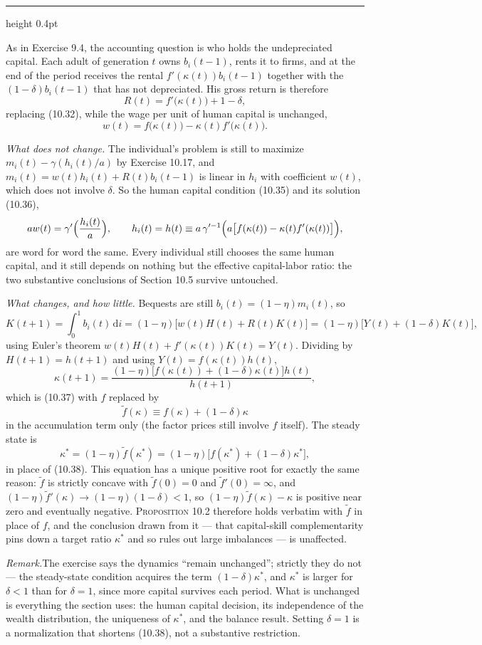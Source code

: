 \documentclass[11pt,letterpaper,reqno]{amsart}
\makeatletter
\newcommand{\wt}[1]{\widetilde{#1}}
\newcommand{\dd}{\,\mathrm{d}}
\newcommand{\as@head}[3]{%
  \par\addvspace{1.6ex}\penalty-200\relax
  \phantomsection
  \addcontentsline{toc}{subsection}{#1 #2\texorpdfstring{\ifx\relax#3\relax\else\quad #3\fi}{}}%
  {\color{RuleGrey}\hrule height 0.4pt}%
  \nobreak\vspace{0.8ex}\nobreak
  \noindent{\bfseries #1 #2}%
  \ifx\relax#3\relax\else\quad{\bfseries\itshape #3}\fi
  \par\nobreak\vspace{0.4ex}\nobreak
  \as@beginstatement
}
\newcommand{\as@beginstatement}{\begingroup\itshape\ignorespaces}
\newenvironment{aex}[2]{\as@head{Exercise}{#1}{#2}}{\par\addvspace{1.2ex}}
\newcommand{\rmk}[1]{%
  \par\vspace{0.6ex}%
  {\small\noindent\textit{Remark.}\hspace{0.5em}#1\par}%
  \vspace{0.4ex}%
}
\newcommand{\bk}[1]{\textup{\textsc{#1}}}
\renewcommand{\as@beginstatement}{\ignorespaces}
\makeatother
\begin{document}
\begin{aex}{10.16}{}
As in Exercise 9.4, the accounting question is who holds the undepreciated capital.  Each adult
of generation $t$ owns $b_i(t-1)$, rents it to firms, and at the end of the period receives the
rental $f'(\kappa(t))b_i(t-1)$ together with the $(1-\delta)b_i(t-1)$ that has not depreciated.
His gross return is therefore
\[
R(t)=f'\bigl(\kappa(t)\bigr)+1-\delta ,
\]
replacing \bk{(10.32)}, while the wage per unit of human capital is unchanged,
\[
w(t)=f\bigl(\kappa(t)\bigr)-\kappa(t)f'\bigl(\kappa(t)\bigr).
\]

\emph{What does not change.}  The individual's problem is still to maximize
$m_i(t)-\gamma(h_i(t)/a)$ by Exercise 10.17, and $m_i(t)=w(t)h_i(t)+R(t)b_i(t-1)$ is linear in
$h_i$ with coefficient $w(t)$, which does not involve $\delta$.  So the human capital condition
\bk{(10.35)} and its solution \bk{(10.36)},
\[
aw(t)=\gamma'\Bigl(\frac{h_i(t)}{a}\Bigr),
\qquad
h_i(t)=h(t)\equiv a\,\gamma'^{-1}\Bigl(a\bigl[f(\kappa(t))-\kappa(t)f'(\kappa(t))\bigr]\Bigr),
\]
are word for word the same.  Every individual still chooses the same human capital, and it still
depends on nothing but the effective capital-labor ratio: the two substantive conclusions of
Section 10.5 survive untouched.

\emph{What changes, and how little.}  Bequests are still $b_i(t)=(1-\eta)m_i(t)$, so
\[
K(t+1)=\int_{0}^{1}b_i(t)\dd i=(1-\eta)\bigl[w(t)H(t)+R(t)K(t)\bigr]
=(1-\eta)\bigl[Y(t)+(1-\delta)K(t)\bigr],
\]
using Euler's theorem $w(t)H(t)+f'(\kappa(t))K(t)=Y(t)$.  Dividing by $H(t+1)=h(t+1)$ and using
$Y(t)=f(\kappa(t))h(t)$,
\[
\kappa(t+1)=\frac{(1-\eta)\bigl[f(\kappa(t))+(1-\delta)\kappa(t)\bigr]h(t)}{h(t+1)} ,
\]
which is \bk{(10.37)} with $f$ replaced by
\[
\wt f(\kappa)\equiv f(\kappa)+(1-\delta)\kappa
\]
in the accumulation term only (the factor prices still involve $f$ itself).  The steady state is
\[
\kappa^{*}=(1-\eta)\wt f(\kappa^{*})=(1-\eta)\bigl[f(\kappa^{*})+(1-\delta)\kappa^{*}\bigr],
\]
in place of \bk{(10.38)}.  This equation has a unique positive root for exactly the same reason:
$\wt f$ is strictly concave with $\wt f(0)=0$ and $\wt f'(0)=\infty$, and
$(1-\eta)\wt f'(\kappa)\to(1-\eta)(1-\delta)<1$, so $(1-\eta)\wt f(\kappa)-\kappa$ is positive
near zero and eventually negative.  \bk{Proposition 10.2} therefore holds verbatim with $\wt f$ in
place of $f$, and the conclusion drawn from it --- that capital-skill complementarity pins down a
target ratio $\kappa^{*}$ and so rules out large imbalances --- is unaffected.

\rmk{The exercise says the dynamics ``remain unchanged''; strictly they do not --- the
steady-state condition acquires the term $(1-\delta)\kappa^{*}$, and $\kappa^{*}$ is larger for
$\delta<1$ than for $\delta=1$, since more capital survives each period.  What is unchanged is
everything the section uses: the human capital decision, its independence of the wealth
distribution, the uniqueness of $\kappa^{*}$, and the balance result.  Setting $\delta=1$ is a
normalization that shortens \bk{(10.38)}, not a substantive restriction.}
\end{aex}
\end{document}
